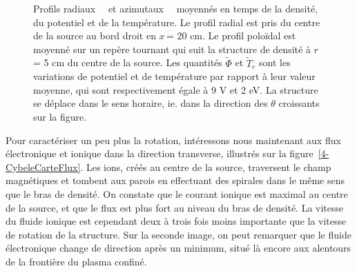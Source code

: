 \begin{refsection}
\begin{figure}[!htbp]
  \centering
    \caption{Profils radiaux~~ et
    azimutaux~~ moyennés en temps de la densité, du
    potentiel et de la température. Le profil radial est pris du centre de la source au bord droit
    en $x\,$= 20 cm. Le profil poloïdal est moyenné sur un repère tournant qui
    suit la structure de densité à $r\,$= 5 cm du centre de la source. Les
    quantités $\tilde{\Phi}$ et $\tilde{T}_e$ sont les variations de potentiel et de température par rapport à leur valeur
    moyenne, qui sont respectivement égale à 9 V et 2 eV. La structure se
    déplace dans le sens horaire, ie. dans la direction des $\theta$ croissants
    sur la figure.}
    \label{4-CybeleProfils}
\end{figure}

Pour caractériser un peu plus la rotation, intéressons nous
maintenant aux flux électronique et ionique dans la direction
transverse, illustrés sur la figure~\ref{4-CybeleCarteFlux}.
Les ions, créés au centre de la source, traversent le champ magnétiques et
tombent aux parois en effectuant des spirales dans le même sens que le bras de
densité. On constate que le courant ionique est maximal au centre de la source,
et que le flux est plus fort au niveau du bras de densité. La
vitesse du fluide ionique est cependant deux à trois fois moins importante que la vitesse de rotation de
la structure. Sur la seconde image, on peut remarquer que le fluide électronique
change de direction après un minimum, situé là encore aux alentours de la
frontière du plasma confiné.


\end{refsection}

